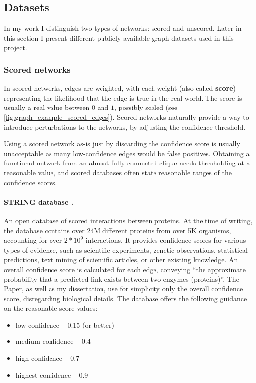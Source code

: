 \subsection{Datasets}\label{sec:datasets}

In my work I distinguish two types of networks: scored and unscored.
Later in this section I present different publicly available graph datasets used in this project.

\subsubsection*{Scored networks}\label{sec:scored_networks}

In scored networks, edges are weighted, with each weight (also called \textbf{score}) representing the likelihood that the edge is true in the real world.
The score is usually a real value between $0$ and $1$, possibly scaled (see \cref{fig:graph_example_scored_edges}).
Scored networks naturally provide a way to introduce perturbations to the networks, by adjusting the confidence threshold.

Using a scored network as-is just by discarding the confidence score is usually unacceptable as many low-confidence edges would be false positives.
Obtaining a functional network from an almost fully connected clique needs thresholding at a reasonable value, and scored databases often state reasonable ranges of the confidence scores.



\paragraph*{STRING database {\normalfont\cite{Szklarczyk2019}}.} An open database of scored interactions between proteins.
At the time of writing, the database contains over 24M different proteins from over 5K organisms, accounting for over $2 * 10^9$ interactions.
It provides confidence scores for various types of evidence, such as scientific experiments, genetic observations, statistical predictions, text mining of scientific articles, or other existing knowledge.
An overall confidence score is calculated for each edge, conveying \enquote{the approximate probability that a predicted link exists between two enzymes (proteins)}.
The Paper, as well as my dissertation, use for simplicity only the overall confidence score, disregarding biological details.
The database offers the following guidance on the reasonable score values:
\begin{itemize}[topsep=5pt,itemsep=-2pt]
    \item low confidence -- 0.15 (or better)
    \item medium confidence -- 0.4
    \item high confidence -- 0.7
    \item highest confidence -- 0.9
\end{itemize}

